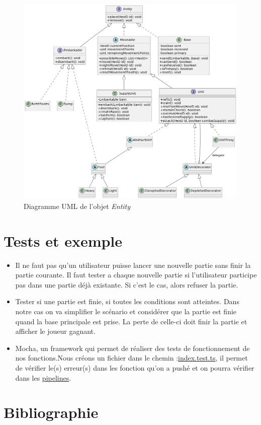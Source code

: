 \documentclass{article}[a4paper, 12pt]
\begin{document}
\begin{figure}[H]
\centering
\includegraphics[scale=0.3]{uml_entityV2.png}
\caption{Diagramme UML de l'objet \emph{Entity}}
\end{figure}

\section{Tests et exemple}
\begin{itemize}
    \item Il ne faut pas qu'un utilisateur puisse lancer une nouvelle partie sans finir la partie courante. Il faut tester a chaque nouvelle partie si l'utilisateur participe pas dans une partie déjà existante. Si c'est le cas, alors refuser la partie.
    \item Tester si une partie est finie, si toutes les conditions sont atteintes. Dans notre cas on va simplifier le scénario et considérer que la partie est finie quand la base principale est prise. La perte de celle-ci doit finir la partie et afficher le joueur gagnant.
    \item Mocha, un framework qui permet de réaliser des tests de fonctionnement de nos fonctions.Nous créons un fichier dans le chemin :\href{https://gitlab.emi.u-bordeaux.fr/vsamson/desert-fox/-/blob/main/src/backend/src/test/index.test.ts}{index.test.ts}, il permet de vérifier le(s) erreur(s) dans les fonction qu'on a pushé et on pourra vérifier dans les \href{https://gitlab.emi.u-bordeaux.fr/vsamson/desert-fox/-/pipelines}{pipelines}.
    
    
\end{itemize}

\section{Bibliographie}



\end{document}
